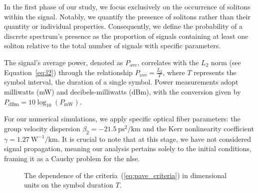 In the first phase of our study, we focus exclusively on the occurrence of solitons within the signal. Notably, we quantify the presence of solitons rather than their quantity or individual properties. Consequently, we define the probability of a discrete spectrum's presence as the proportion of signals containing at least one soliton relative to the total number of signals with specific parameters.

The signal's average power, denoted as \( P_{\text{ave}} \), correlates with the \( L_2 \) norm (see Equation~\ref{eq:l2}) through the relationship \( P_{\text{ave}} = \frac{L_2}{T} \), where \( T \) represents the symbol interval, the duration of a single symbol. Power measurements adopt milliwatts (mW) and decibels-milliwatts (dBm), with the conversion given by \( P_{\text{dBm}} = 10 \log_{10}(P_{\text{mW}}) \).

For our numerical simulations, we apply specific optical fiber parameters: the group velocity dispersion \( \beta_2 = -21.5 \ \text{ps}^2/\text{km} \) and the Kerr nonlinearity coefficient \( \gamma = 1.27 \ \text{W}^{-1}/\text{km} \). It is crucial to note that at this stage, we have not considered signal propagation, meaning our analysis pertains solely to the initial conditions, framing it as a Cauchy problem for the \gls{nlse}.



\begin{figure}[htpb]
    \caption{The dependence of the criteria~(\ref{eq:pave_criteria}) in dimensional units on the symbol duration $ T $.}
    \label{fig:criteria_dim}
\end{figure}


